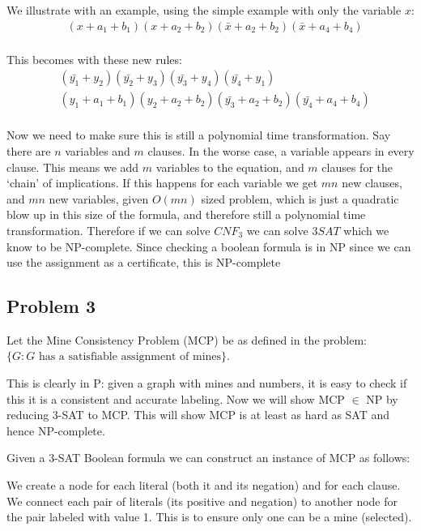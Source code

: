 \documentclass[english]{article}
\begin{document}
We illustrate with an example, using the simple example with only the variable $x$:
\begin{align*}
& (x + a_1 + b_1)(x + a_2 + b_2)(\bar{x} + a_2 + b_2)(\bar{x} + a_4 + b_4) \\
\end{align*}

This becomes with these new rules:
\begin{align*}
& (\bar{y_1} + y_2)(\bar{y_2} + y_3)(\bar{y_3} + y_4)(\bar{y_4} + y_1) \\
& (y_1 + a_1 + b_1)(y_2 + a_2 + b_2)(\bar{y_3} + a_2 + b_2)(\bar{y_4} + a_4 + b_4) \\
\end{align*}

Now we need to make sure this is still a polynomial time transformation. Say there are $n$ variables and $m$
clauses. In the worse case, a variable appears in every clause. This means we add $m$ variables to the equation,
and $m$ clauses for the `chain' of implications. If this happens for each variable we get $mn$ new clauses, and
$mn$ new variables, given $O(mn)$ sized problem, which is just a quadratic blow up in this size of the formula,
and therefore still a polynomial time transformation. Therefore if we can solve $CNF_3$ we can solve $3SAT$ which
we know to be NP-complete. Since checking a boolean formula is in NP since we can use the assignment as a 
certificate, this is NP-complete

\subsection*{Problem 3}
Let the Mine Consistency Problem (MCP) be as defined in the problem:\\
$\{G : G \text{ has a satisfiable assignment of mines}\}$.

This is clearly in P: given a graph with mines and numbers, it is easy to check if this it is a
consistent and accurate labeling. Now we will show MCP $\in$ NP by reducing 3-SAT to MCP. This will
show MCP is at least as hard as SAT and hence NP-complete.

Given a 3-SAT Boolean formula we can construct an instance of MCP as follows:

We create a node for each literal (both it and its negation) and for each clause. We connect each
pair of literals (its positive and negation) to another node for the pair labeled with value 1. This
is to ensure only one can be a mine (selected).
\end{document}
